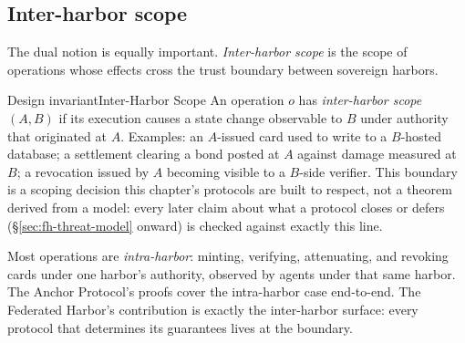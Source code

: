 \documentclass[11pt,a4paper]{article}
\theoremstyle{definition}
\theoremstyle{remark}
\begin{document}
\subsection{Inter-harbor scope}\label{sec:fh-scope-property}
The dual notion is equally important. \emph{Inter-harbor scope} is the scope of operations whose effects cross the trust boundary between sovereign harbors.
\begin{pdclaim}{Design invariant}{Inter-Harbor Scope}
\setlength{\parskip}{4pt plus 1pt}
\label{def:fh-interscope}
An operation $o$ has \emph{inter-harbor scope $(A, B)$} if its execution causes a state change observable to $B$ under authority that originated at $A$. 
Examples: an $A$-issued card used to write to a $B$-hosted database; a settlement clearing a bond posted at $A$ against damage measured at $B$; a revocation issued by $A$ becoming visible to a $B$-side verifier. 
This boundary is a scoping decision this chapter's protocols are built to respect, not a theorem derived from a model: every later claim about what a protocol closes or defers (\S\ref{sec:fh-threat-model} onward) is checked against exactly this line.
\end{pdclaim}
Most operations are \emph{intra-harbor}: minting, verifying, attenuating, and revoking cards under one harbor's authority, observed by agents under that same harbor. The Anchor Protocol's proofs cover the intra-harbor case end-to-end. The Federated Harbor's contribution is exactly the inter-harbor surface: every protocol that determines its guarantees lives at the boundary.
\end{document}

